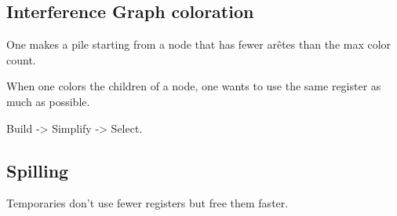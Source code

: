 \documentclass[a4paper,11pt]{article}
\begin{document}
\subsection{Interference Graph coloration}

One makes a pile starting from a node that has fewer arêtes than the max color
count.

When one colors the children of a node, one wants to use the same register as
much as possible.

Build -> Simplify -> Select.

\subsection{Spilling}

Temporaries don't use fewer registers but free them faster.
\end{document}

